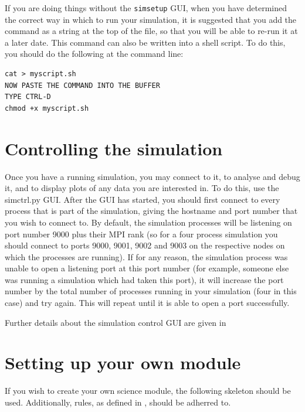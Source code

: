 \documentclass{article}
\begin{document}
If you are doing things without the \texttt{simsetup} GUI, when you
have determined the correct way in which to run your simulation, it is
suggested that you add the command as a string at the top of the file,
so that you will be able to re-run it at a later date.  This command
can also be written into a shell script.  To do this, you should do
the following at the command line:
\begin{verbatim}
cat > myscript.sh
NOW PASTE THE COMMAND INTO THE BUFFER
TYPE CTRL-D
chmod +x myscript.sh
\end{verbatim}

\section{Controlling the simulation}
Once you have a running simulation, you may connect to it, to analyse
and debug it, and to display plots of any data you are interested in.
To do this, use the simctrl.py GUI.  After the GUI has started, you
should first connect to every process that is part of the simulation,
giving the hostname and port number that you wish to connect to.  By
default, the simulation processes will be listening on port number
9000 plus their MPI rank (so for a four process simulation you should
connect to ports 9000, 9001, 9002 and 9003 on the respective nodes on
which the processes are running).  If for any reason, the simulation
process was unable to open a listening port at this port number (for
example, someone else was running a simulation which had taken this
port), it will increase the port number by the total number of
processes running in your simulation (four in this case) and try
again.  This will repeat until it is able to open a port successfully.

Further details about the simulation control GUI are given in
\citet{simctrlgui}

\section{Setting up your own module}
If you wish to create your own science module, the following skeleton
should be used.  Additionally, rules, as defined in \citet{overview},
should be adherred to.
\end{document}
